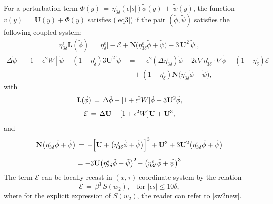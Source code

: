 \documentclass[10pt, reqno]{amsart}
\numberwithin{equation}{section}
\theoremstyle{definition}
\begin{document}
{{\medskip
For a perturbation term $\Phi(y) \,=\, \eta_{3\delta}^{\epsilon}(\epsilon |s|){\tilde\phi}(y) \,+\, {\tilde\psi}(y)$, the function $v(y) \,=\, \mathbf{U}(y)+\Phi(y)$
satisfies (\ref{eq3}) if the pair $({{\tilde\phi}}, {{ \tilde \psi}})$ satisfies the following coupled system:
\begin{align}
\eta_{3\delta}^{\epsilon}\mathbf{L}(\tilde \phi)
 \,=\,
\eta_{\delta}^{\epsilon}\Big[-{\mathcal E}
+ \mathbf{N}\big(\eta_{3\delta}^{\epsilon}{\tilde\phi}+{\tilde\psi}\big)
-3\, \mathbf{U}^2 \, {\tilde\psi}\Big],
\label{equivalent-system-1}
\end{align}
\begin{align} \label{equivalent-system-2}
 \Delta \tilde \psi- [1+ \epsilon^2 W] \tilde \psi + (1-\eta_{\delta}^{\epsilon}) 3\mathbf{U}^2 \, {\tilde\psi} & \,=\, -\epsilon^2 (\Delta \eta_{3\delta}^{\epsilon}){ \tilde \phi}-2\epsilon \nabla \eta_{3\delta}^{\epsilon} \cdot
\nabla{\tilde\phi}
-(1-\eta_{\delta}^{\epsilon}){\mathcal E}
\nonumber
\\[2mm]
&\quad +(1-\eta_{\delta}^{\epsilon})\mathbf{N}\big(\eta_{3\delta}^{\epsilon}{\tilde\phi}+{\tilde\psi}\big),
\end{align}
 with
\begin{align*}
 \mathbf{L}({\tilde\phi}) \,=\, \Delta{\tilde\phi} - [1+ \epsilon^2 W]{\tilde\phi} +3{\bf U}^2{\tilde\phi},
\end{align*}
\begin{align*}
 {\mathcal E} \,=\, \Delta {\bf U} -[1+\epsilon^2 W] {\bf U} + {\bf U}^3,
\end{align*}
 and
\begin{align*}
 \mathbf{N}\big(\eta_{3\delta}^{\epsilon}{\tilde\phi}+{\tilde\psi}\big)
 & \,=\,
 -\Big[{\bf U} + \big(\eta_{3\delta}^{\epsilon}{\tilde\phi}+{\tilde\psi}\big)\Big]^3 + {\bf U}^3 + 3{\bf U}^2\big(\eta_{3\delta}^{\epsilon}{\tilde\phi}+{\tilde\psi}\big)\nonumber
 \\[2mm]
 & =
 -3{\bf U}\big(\eta_{3\delta}^{\epsilon}{\tilde\phi}+{\tilde\psi}\big)^2 -\big(\eta_{3\delta}^{\epsilon}{\tilde\phi}+{\tilde\psi}\big)^3.
\end{align*}
The term ${ {\mathcal E}}$ can be locally recast in $(x, \tau)$ coordinate system by the relation
\begin{equation}\label{errorrelationinterior}
{{\mathcal E}} \,=\, \beta^3\, S(w_2), \quad \text{for $|\epsilon s|\leq 10\delta$},
\end{equation}
where for the explicit expression of $S(w_2)$, the reader can refer to \eqref{sw2new}.


}}
\end{document}
